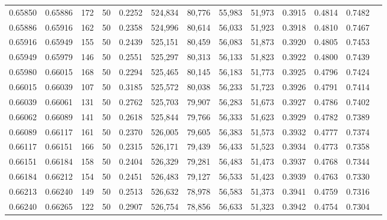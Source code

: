 \begin{tabular}{rrrrrrrrrrrrr}
0.65850 & 0.65886 &   172 &  50 &                                     0.2252 & 524,834 &  80,776 &  55,983 &  51,973 & 0.3915 & 0.4814 & 0.7482 \\
0.65886 & 0.65916 &   162 &  50 &                                     0.2358 & 524,996 &  80,614 &  56,033 &  51,923 & 0.3918 & 0.4810 & 0.7467 \\
0.65916 & 0.65949 &   155 &  50 &                                     0.2439 & 525,151 &  80,459 &  56,083 &  51,873 & 0.3920 & 0.4805 & 0.7453 \\
0.65949 & 0.65979 &   146 &  50 &                                     0.2551 & 525,297 &  80,313 &  56,133 &  51,823 & 0.3922 & 0.4800 & 0.7439 \\
0.65980 & 0.66015 &   168 &  50 &                                     0.2294 & 525,465 &  80,145 &  56,183 &  51,773 & 0.3925 & 0.4796 & 0.7424 \\
0.66015 & 0.66039 &   107 &  50 &                                     0.3185 & 525,572 &  80,038 &  56,233 &  51,723 & 0.3926 & 0.4791 & 0.7414 \\
0.66039 & 0.66061 &   131 &  50 &                                     0.2762 & 525,703 &  79,907 &  56,283 &  51,673 & 0.3927 & 0.4786 & 0.7402 \\
0.66062 & 0.66089 &   141 &  50 &                                     0.2618 & 525,844 &  79,766 &  56,333 &  51,623 & 0.3929 & 0.4782 & 0.7389 \\
0.66089 & 0.66117 &   161 &  50 &                                     0.2370 & 526,005 &  79,605 &  56,383 &  51,573 & 0.3932 & 0.4777 & 0.7374 \\
0.66117 & 0.66151 &   166 &  50 &                                     0.2315 & 526,171 &  79,439 &  56,433 &  51,523 & 0.3934 & 0.4773 & 0.7358 \\
0.66151 & 0.66184 &   158 &  50 &                                     0.2404 & 526,329 &  79,281 &  56,483 &  51,473 & 0.3937 & 0.4768 & 0.7344 \\
0.66184 & 0.66212 &   154 &  50 &                                     0.2451 & 526,483 &  79,127 &  56,533 &  51,423 & 0.3939 & 0.4763 & 0.7330 \\
0.66213 & 0.66240 &   149 &  50 &                                     0.2513 & 526,632 &  78,978 &  56,583 &  51,373 & 0.3941 & 0.4759 & 0.7316 \\
0.66240 & 0.66265 &   122 &  50 &                                     0.2907 & 526,754 &  78,856 &  56,633 &  51,323 & 0.3942 & 0.4754 & 0.7304 \\

\end{tabular}
